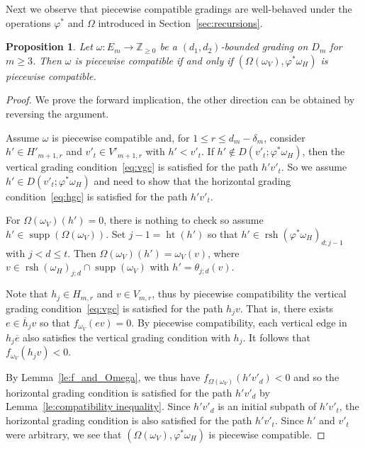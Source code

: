 \documentclass[10pt]{amsart}
\newtheorem{proposition}[theorem]{Proposition}
\theoremstyle{definition}
\newcommand{\ZZ}{\mathbb{Z}}
\DeclareMathOperator{\hgt}{ht}
\DeclareMathOperator{\supp}{supp}
\DeclareMathOperator{\rsh}{rsh}
\begin{document}
Next we observe that piecewise compatible gradings are well-behaved under the operations $\varphi^*$ and $\Omega$ introduced in Section~\ref{sec:recursions}.
\begin{proposition}
 \label{prop:piecewise equivalence}
 Let $\omega:E_m\to\ZZ_{\ge0}$ be a $(d_1,d_2)$-bounded grading on $D_m$ for $m\ge3$. 
 Then $\omega$ is piecewise compatible if and only if $(\Omega(\omega_V),\varphi^*\omega_H)$ is piecewise compatible.
\end{proposition} 
\begin{proof}
 We prove the forward implication, the other direction can be obtained by reversing the argument. 

 Assume $\omega$ is piecewise compatible and, for $1\le r\le d_m-\delta_m$, consider $h'\in H'_{m+1,r}$ and $v'_t\in V'_{m+1,r}$ with $h'<v'_t$. 
 If $h'\notin D(v'_t;\varphi^*\omega_H)$, then the vertical grading condition~\eqref{eq:vgc} is satisfied for the path $h'v'_t$. 
 So we assume $h'\in D(v'_t;\varphi^*\omega_H)$ and need to show that the horizontal grading condition~\eqref{eq:hgc} is satisfied for the path $h'v'_t$.

 For $\Omega(\omega_V)(h')=0$, there is nothing to check so assume $h'\in\supp(\Omega(\omega_V))$.
 Set $j-1=\hgt(h')$ so that $h'\in\rsh(\varphi^*\omega_H)_{d;j-1}$ with $j<d\le t$.
 Then $\Omega(\omega_V)(h')=\omega_V(v)$, where $v\in\rsh(\omega_H)_{j;d}\cap\supp(\omega_V)$ with $h'=\theta_{j;d}(v)$.

 Note that $h_j\in H_{m,r}$ and $v\in V_{m,r}$, thus by piecewise compatibility the vertical grading condition~\eqref{eq:vgc} is satisfied for the path $h_jv$. 
 That is, there exists $e\in\overline{h}_jv$ so that $f_{\omega_V}(ev)=0$.
 By piecewise compatibility, each vertical edge in $h_j\overline{e}$ also satisfies the vertical grading condition with $h_j$.
 It follows that $f_{\omega_V}(h_jv)<0$.

 By Lemma~\ref{le:f_and_Omega}, we thus have $f_{\Omega(\omega_V)}(h'v'_d)<0$ and so the horizontal grading condition is satisfied for the path $h'v'_d$ by Lemma~\ref{le:compatibility inequality}.
 Since $h'v'_d$ is an initial subpath of $h'v'_t$, the horizontal grading condition is also satisfied for the path $h'v'_t$. 
 Since $h'$ and $v'_t$ were arbitrary, we see that $(\Omega(\omega_V),\varphi^*\omega_H)$ is piecewise compatible.
\end{proof} 
\end{document}
